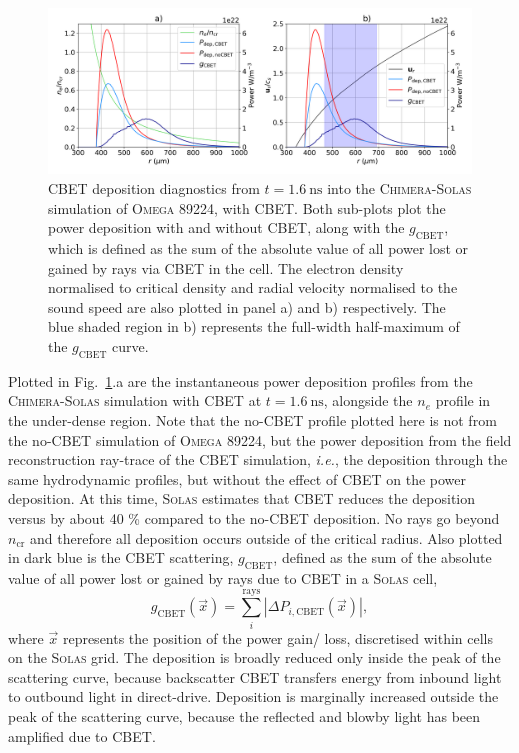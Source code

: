 \begin{figure}[t!]
    \includegraphics[width=\linewidth]{Numerics/Images/89224_it160_pdepcbet.png}
    \centering
    \caption{\ac{CBET} deposition diagnostics from $t=1.6\ \text{ns}$ into the \textsc{Chimera}-\textsc{Solas} simulation of \textsc{Omega} 89224, with \ac{CBET}.
    Both sub-plots plot the power deposition with and without \ac{CBET}, along with the $g_{\text{CBET}}$, which is defined as the sum of the absolute value of all power lost or gained by rays via \ac{CBET} in the cell.
    The electron density normalised to critical density and radial velocity normalised to the sound speed are also plotted in panel a) and b) respectively.
    The blue shaded region in b) represents the full-width half-maximum of the $g_{\text{CBET}}$ curve.}%
    \label{fig:SOLAS_89224_pdep}
\end{figure}

Plotted in Fig.~\ref{fig:SOLAS_89224_pdep}.a are the instantaneous power deposition profiles from the \textsc{Chimera}-\textsc{Solas} simulation with \ac{CBET} at $t=1.6\ \text{ns}$, alongside the $n_e$ profile in the under-dense region.
Note that the no-\ac{CBET} profile plotted here is not from the no-\ac{CBET} simulation of \textsc{Omega} 89224, but the power deposition from the field reconstruction ray-trace of the \ac{CBET} simulation, \textit{i.e.}, the deposition through the same hydrodynamic profiles, but without the effect of \ac{CBET} on the power deposition.
At this time, \textsc{Solas} estimates that \ac{CBET} reduces the deposition versus by about 40 \% compared to the no-\ac{CBET} deposition.
No rays go beyond $n_{\text{cr}}$ and therefore all deposition occurs outside of the critical radius.
Also plotted in dark blue is the \ac{CBET} scattering, $g_{\text{CBET}}$, defined as the sum of the absolute value of all power lost or gained by rays due to \ac{CBET} in a \textsc{Solas} cell,
\begin{equation}
    g_{\text{CBET}}(\vec{x}) = \sum_{i}^{\text{rays}} \left| \Delta P_{i,\text{CBET}}(\vec{x}) \right|,
\end{equation}
where $\vec{x}$ represents the position of the power gain/ loss, discretised within cells on the \textsc{Solas} grid.
The deposition is broadly reduced only inside the peak of the scattering curve, because backscatter \ac{CBET} transfers energy from inbound light to outbound light in direct-drive.
Deposition is marginally increased outside the peak of the scattering curve, because the reflected and blowby light has been amplified due to \ac{CBET}.

